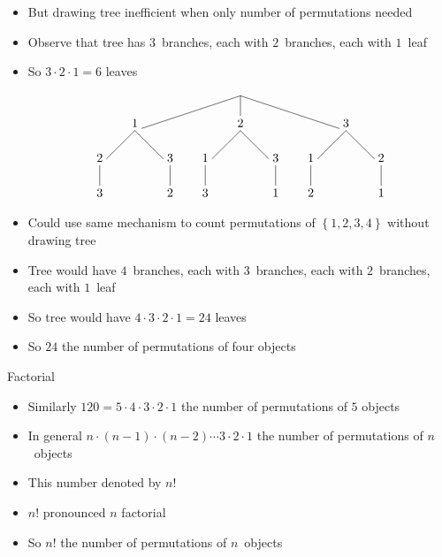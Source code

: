 \documentclass[handout]{beamer}
\theoremstyle{definition}
\begin{document}
\begin{frame}
\begin{itemize}
\item But drawing tree inefficient when only
\alert{number} of permutations needed
\item Observe that tree has $3$~branches,
each with $2$~branches, each with $1$~leaf
\item So $3\cdot 2\cdot 1=6$ leaves
\[\begin{xy}<1cm,0cm>:
(0,0)="0";
(-3,-1)="-31";
(0,-1)="01";
(3,-1)="31";
"0";"-31"*+!D{1}**\dir{-};
"0";"01"*+!D{2}**\dir{-};
"0";"31"*+!D{3}**\dir{-};
"-31";(-4,-2)*+!D{2}**\dir{-};
(-4,-3)*+!D{3}**\dir{-};
"-31";(-2,-2)*+!D{3}**\dir{-};
(-2,-3)*+!D{2}**\dir{-};
"01";(-1,-2)*+!D{1}**\dir{-};
(-1,-3)*+!D{3}**\dir{-};
"01";(1,-2)*+!D{3}**\dir{-};
(1,-3)*+!D{1}**\dir{-};
"31";(2,-2)*+!D{1}**\dir{-};
(2,-3)*+!D{2}**\dir{-};
"31";(4,-2)*+!D{2}**\dir{-};
(4,-3)*+!D{1}**\dir{-};
\end{xy}\]
\item Could use same mechanism to count permutations
of $\left\{1,2,3,4\right\}$ without drawing tree
\item Tree would have $4$~branches, each with $3$~branches,
each with $2$~branches, each with $1$~leaf
\item So tree would have $4\cdot 3\cdot 2\cdot 1=24$ leaves
\item So $24$ the number of permutations of four objects
\end{itemize}
\end{frame}

\begin{frame}{Factorial}
\begin{itemize}
\item Similarly $120=5\cdot 4\cdot 3\cdot 2\cdot 1$
the number of permutations of $5$ objects
\item In general $n\cdot\left(n-1\right)\cdot\left(n-2\right)
\cdots 3\cdot 2\cdot 1$ the number of permutations of $n$~objects
\item This number denoted by \alert{$n!$}
\item $n!$ pronounced \alert{$n$ factorial}
\item So $n!$ the number of permutations of $n$~objects
\end{itemize}
\end{frame}
\end{document}
